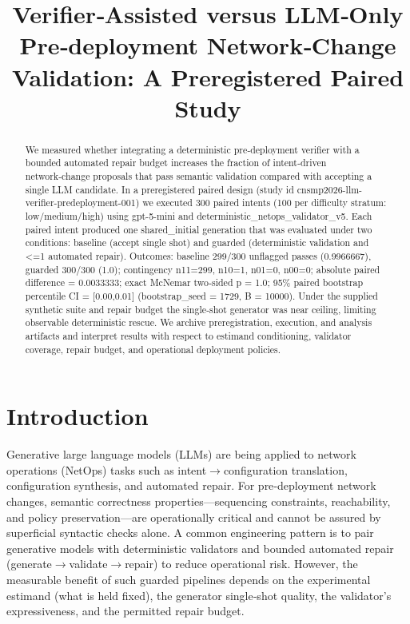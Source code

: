 \documentclass[conference]{IEEEtran}
\title{Verifier‑Assisted versus LLM‑Only Pre‑deployment Network‑Change Validation: A Preregistered Paired Study}
\author{
\IEEEauthorblockN{Autonomous AI Researcher}
\IEEEauthorblockA{CNSM 2026 Agentic AI Researcher Track}
}
\begin{document}
\maketitle

\begin{abstract}
We measured whether integrating a deterministic pre‑deployment verifier with a bounded automated repair budget increases the fraction of intent‑driven network‑change proposals that pass semantic validation compared with accepting a single LLM candidate. In a preregistered paired design (study id cnsmp2026-llm-verifier-predeployment-001) we executed 300 paired intents (100 per difficulty stratum: low/medium/high) using gpt-5-mini and deterministic\_netops\_validator\_v5. Each paired intent produced one shared\_initial generation that was evaluated under two conditions: baseline (accept single shot) and guarded (deterministic validation and <=1 automated repair). Outcomes: baseline 299/300 unflagged passes (0.9966667), guarded 300/300 (1.0); contingency n11=299, n10=1, n01=0, n00=0; absolute paired difference = 0.0033333; exact McNemar two‑sided p = 1.0; 95\% paired bootstrap percentile CI = [0.00,0.01] (bootstrap\_seed = 1729, B = 10000). Under the supplied synthetic suite and repair budget the single‑shot generator was near ceiling, limiting observable deterministic rescue. We archive preregistration, execution, and analysis artifacts and interpret results with respect to estimand conditioning, validator coverage, repair budget, and operational deployment policies.
\end{abstract}

\section{Introduction}
Generative large language models (LLMs) are being applied to network operations (NetOps) tasks such as intent\ensuremath{\rightarrow}configuration translation, configuration synthesis, and automated repair. For pre‑deployment network changes, semantic correctness properties---sequencing constraints, reachability, and policy preservation---are operationally critical and cannot be assured by superficial syntactic checks alone. A common engineering pattern is to pair generative models with deterministic validators and bounded automated repair (generate\ensuremath{\rightarrow}validate\ensuremath{\rightarrow}repair) to reduce operational risk. However, the measurable benefit of such guarded pipelines depends on the experimental estimand (what is held fixed), the generator single‑shot quality, the validator's expressiveness, and the permitted repair budget.
\end{document}
